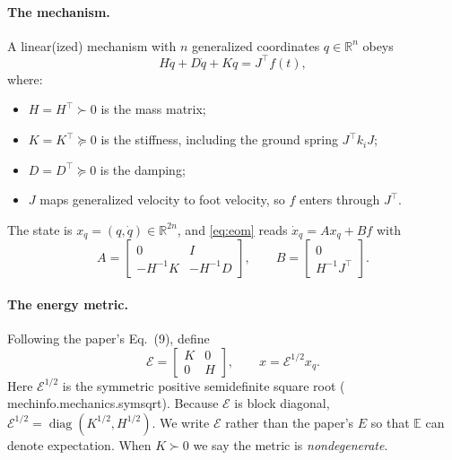 \documentclass[11pt]{article}
\theoremstyle{definition}
\theoremstyle{remark}
\newcommand{\R}{\mathbb{R}}
\newcommand{\E}{\mathbb{E}}
\newcommand{\diag}{\operatorname{diag}}
\newcommand{\Em}{\mathcal{E}}         %
\newcommand{\codeus}{\textunderscore\allowbreak}
\newcommand{\code}[1]{{\ttfamily\let\_\codeus\hyphenchar\font=-1 #1}}
\begin{document}
\paragraph{The mechanism.} A linear(ized) mechanism with $n$ generalized coordinates
$q\in\R^n$ obeys
\begin{equation}\label{eq:eom}
  H\ddot q + D\dot q + Kq = J^\top f(t),
\end{equation}
where:
\begin{itemize}[nosep]
  \item $H=H^\top\succ0$ is the mass matrix;
  \item $K=K^\top\succeq0$ is the stiffness, including the ground spring $J^\top k_iJ$;
  \item $D=D^\top\succeq0$ is the damping;
  \item $J$ maps generalized velocity to foot velocity, so $f$ enters through $J^\top$.
\end{itemize}
The state is $x_q=(q,\dot q)\in\R^{2n}$, and \eqref{eq:eom} reads
$\dot x_q = Ax_q + B f$ with
\begin{equation}\label{eq:AB}
  A=\begin{bmatrix}0&I\\-H^{-1}K&-H^{-1}D\end{bmatrix},\qquad
  B=\begin{bmatrix}0\\H^{-1}J^\top\end{bmatrix}.
\end{equation}

\paragraph{The energy metric.} Following the paper's Eq.~(9), define
\begin{equation}\label{eq:metric}
  \Em=\begin{bmatrix}K&0\\0&H\end{bmatrix},\qquad x=\Em^{1/2}x_q .
\end{equation}
Here $\Em^{1/2}$ is the symmetric positive semidefinite square root
(\code{mechinfo.mechanics.sym\_sqrt}). Because $\Em$ is block diagonal, $\Em^{1/2} =
\diag(K^{1/2},H^{1/2})$. We write $\Em$ rather than the paper's $E$ so that $\E$ can denote
expectation. When $K\succ0$ we say the metric is \emph{nondegenerate}.
\end{document}
